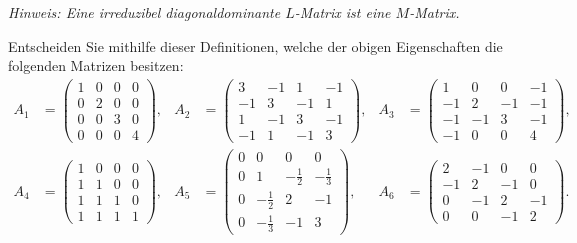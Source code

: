 \documentclass{exercise}
\begin{document}
\begin{problem}
\begin{itemize}
            \emph{Hinweis: Eine irreduzibel diagonaldominante \(L\)-Matrix ist eine \(M\)-Matrix.}
        \end{itemize}
        Entscheiden Sie mithilfe dieser Definitionen, welche der obigen Eigenschaften die folgenden Matrizen besitzen:
        \begin{align*}
            A_1 &= \begin{pmatrix}
                1 & 0 & 0 & 0\\
                0 & 2 & 0 & 0\\
                0 & 0 & 3 & 0\\
                0 & 0 & 0 & 4
            \end{pmatrix}, & A_2 &= \begin{pmatrix}
                3 & -1 & 1 & -1\\
                -1 & 3 & -1 & 1\\
                1 & -1 & 3 & -1\\
                -1 & 1 & -1 & 3
            \end{pmatrix}, & A_3 &= \begin{pmatrix}
                1 & 0 & 0 & -1\\
                -1 & 2 & -1 & -1\\
                -1 & -1 & 3 & -1\\
                -1 & 0 & 0 & 4
            \end{pmatrix},\\
            A_4 &= \begin{pmatrix}
                1 & 0 & 0 & 0\\
                1 & 1 & 0 & 0\\
                1 & 1 & 1 & 0\\
                1 & 1 & 1 & 1
            \end{pmatrix}, & A_5 &= \begin{pmatrix}
                0 & 0 & 0 & 0\\
                0 & 1 & -\frac{1}{2} & -\frac{1}{3}\\
                0 & -\frac{1}{2} & 2 & -1\\
                0 & -\frac{1}{3} & -1 & 3
            \end{pmatrix}, & A_6 &= \begin{pmatrix}
                2 & -1 & 0 & 0\\
                -1 & 2 & -1 & 0\\
                0 & -1 & 2 & -1\\
                0 & 0 & -1 & 2
            \end{pmatrix}.
        \end{align*}
    \end{problem}
    
\end{document}
